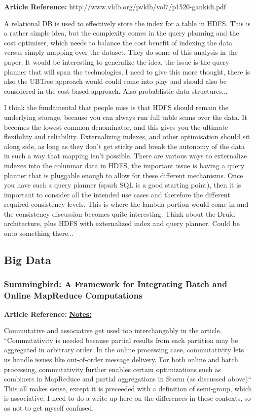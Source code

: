 \documentclass{article}
\begin{document}
\textbf{Article Reference:} http://www.vldb.org/pvldb/vol7/p1520-gankidi.pdf

A relational DB is used to effectively store the index for a table in HDFS. This is a rather simple idea, but the complexity comes in the query planning and the cost optimiser, which needs to balance the cost benefit of indexing the data versus simply mapping over the dataset. They do some of this analysis in the paper. It would be interesting to generalize the idea, the issue is the query planner that will span the technologies, I need to give this more thought, there is also the UBTree approach would could come into play and should also be considered in the cost based approach. Also probablistic data structures...

I think the fundamental that people miss is that HDFS should remain the underlying storage, because you can always run full table scans over the data. It becomes the lowest common denominator, and this gives you the ultimate flexibility and reliability. Externalizing indexes, and other optimisation should sit along side, as long as they don't get sticky and break the autonomy of the data in such a way that mapping isn't possible. There are various ways to externalize indexes into the colunmar data in HDFS, the important issue is having a query planner that is pluggable enough to allow for these different mechanisms. Once you have such a query planner (spark SQL is a good starting point), then it is important to consider all the intended use cases and therefore the different required consistency levels. This is where the lambda portion would come in and the consistency discussion becomes quite interesting. Think about the Druid architecture, plus HDFS with externalized index and query planner. Could be onto something there...

\subsection{Big Data}

\subsubsection{Summingbird: A Framework for Integrating Batch and Online MapReduce Computations}

\textbf{Article Reference:} \href{http://www.vldb.org/pvldb/vol7/p1441-boykin.pdf}

\textbf{Notes:}

Commutative and associative get used too interchangably in the article. ``Commutativity is needed because partial results from each partition may be aggregated in arbitrary order. In the online processing case, commutativity lets us handle issues like out-of-order message delivery. For both online and batch processing, commutativity further enables certain optimizations such as combiners in MapReduce and partial aggregations in Storm (as discussed above)`` This all makes sense, except it is preceeded with a definition of semi-group, which is associative. I need to do a write up here on the differences in these contexts, so as not to get myself confused.
\end{document}
